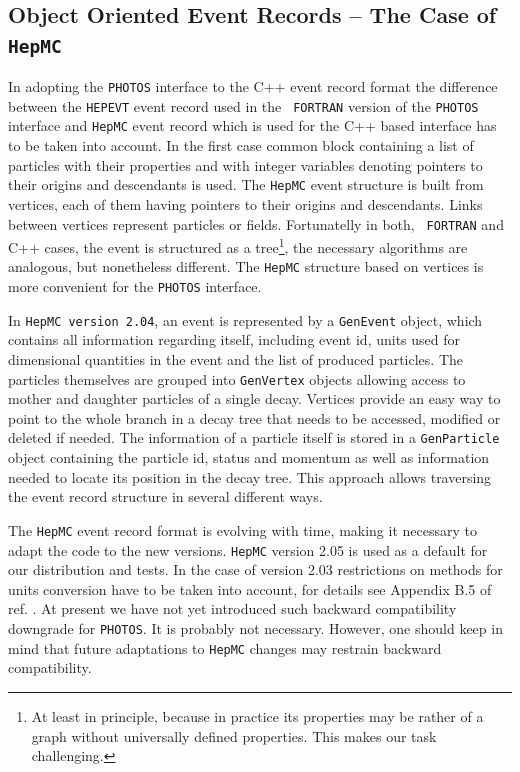 \documentclass[]{Photos_interface_design}
\begin{document}
\subsection{Object Oriented Event Records  -- The Case of {\tt HepMC}}
 In adopting the {\tt PHOTOS} interface to the C++ event record format
the difference between the {\tt HEPEVT} event record used in the {\tt
  FORTRAN} version of the {\tt PHOTOS} interface and {\tt HepMC} event
record which is used for the C++ based interface has to be taken into
account.  In the first case 
common block containing a list of particles with their properties and
with integer variables denoting pointers to their origins and
descendants is used.  The {\tt HepMC} event structure is built from vertices,
each of them having pointers to their origins and descendants. Links
between vertices represent particles or fields.  Fortunatelly in both, {\tt
  FORTRAN} and C++ cases, the event is structured as a
tree\footnote{At least in principle, because in practice its
properties may be rather of a graph without universally defined
properties.  This makes our task challenging.}, the necessary
algorithms are analogous, but nonetheless different. The {\tt HepMC}
structure based on vertices is more convenient for the {\tt PHOTOS}
interface. 

In {\tt HepMC version 2.04}, an  event is represented by a {\tt GenEvent} object,
which contains all information regarding itself, including event id,
units used for dimensional quantities in the event and the list of produced particles. The particles
themselves are grouped into {\tt GenVertex} objects allowing access to mother
and daughter particles of a single decay. Vertices provide an easy way
to point to the whole branch in a decay tree that needs to be accessed,
modified or deleted if needed. The information of a particle  itself is stored
in a {\tt GenParticle} object containing the particle id, status and momentum
as well as information needed to locate its position in the decay tree.
This approach allows traversing the event record structure in several different
ways.

The {\tt HepMC} event record format is  evolving with time, making it necessary
 to adapt
the code to the new versions.
{\tt HepMC} version 2.05 is used as a default for our distribution and tests. 
In the case of version 2.03 restrictions on methods for 
units
conversion have to be taken into account, for details see Appendix B.5
of ref. \cite{Davidson:2010rw}. At present we have not yet introduced such 
backward compatibility downgrade for {\tt PHOTOS}. It is probably not necessary.
However,
one should keep in mind that future adaptations to {\tt HepMC} changes may restrain
backward compatibility.
\end{document}
